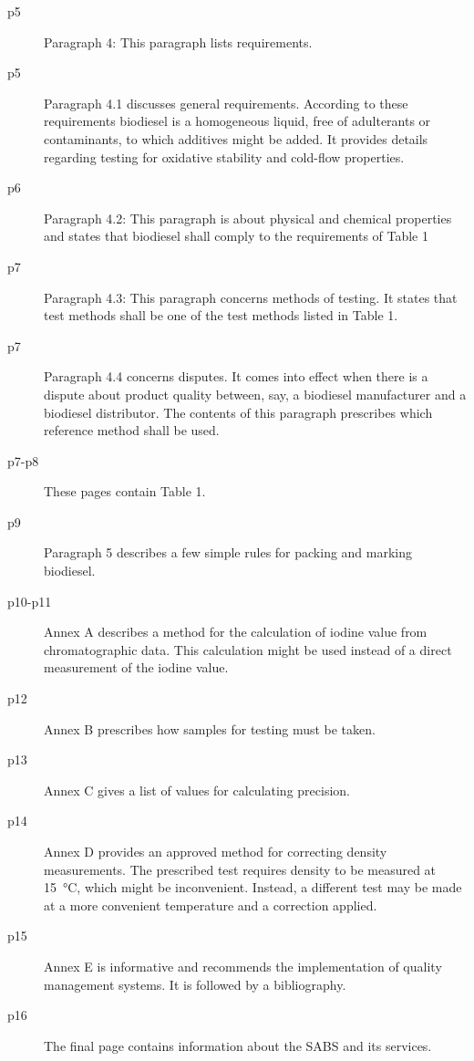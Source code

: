 \begin{description}
\item[p5]{Paragraph 4: This paragraph lists requirements.} 

\item[p5]{Paragraph 4.1 discusses general requirements. According to these
requirements biodiesel is a homogeneous liquid, free of adulterants or
contaminants, to which additives might be added. It provides details regarding
testing for oxidative stability and cold-flow properties.}

\item[p6]{Paragraph 4.2: This paragraph is about physical and chemical
properties and states that biodiesel shall comply to the requirements of Table
1}

\item[p7]{Paragraph 4.3: This paragraph concerns methods of testing. It states that
test methods shall be  one of the test methods listed in Table 1.}

\item[p7]{Paragraph 4.4 concerns disputes. It comes into effect when there is a
dispute about product quality between, say, a biodiesel manufacturer and a
biodiesel distributor. The contents of this paragraph prescribes which reference
method shall be used.}

\item[p7-p8]{These pages contain Table 1.}

\item[p9]{Paragraph 5 describes a few simple rules for packing and marking biodiesel.}

\item[p10-p11]{Annex A describes a method for the calculation of iodine value
from chromatographic data. This calculation might be used instead of a direct
measurement of the iodine value.}

\item[p12]{Annex B prescribes how samples for testing must be taken.}

\item[p13]{Annex C gives a list of values for calculating precision.}

\item[p14]{Annex D provides an approved method for correcting density
measurements. The prescribed test requires density to be measured at
\SI{15}{\celsius}, which might be inconvenient. Instead, a different test may be
made at a more convenient temperature and a correction applied. }

\item[p15]{Annex E is informative and recommends the implementation of quality
management systems. It is followed by a bibliography.}

\item[p16]{The final page contains information about the SABS and its services.}

\end{description} 

